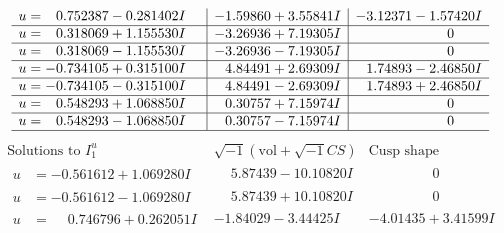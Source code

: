 \documentclass[1p]{elsarticle_modified}
\theoremstyle{definition}
\newcommand{\I}{\sqrt{-1}}
\begin{document}
$$\begin{array}{c|c|c}
\begin{aligned}
u &= \phantom{-}0.752387 - 0.281402 I\end{aligned}
 & -1.59860 + 3.55841 I & -3.12371 - 1.57420 I \\ \hline\begin{aligned}
u &= \phantom{-}0.318069 + 1.155530 I\end{aligned}
 & -3.26936 + 7.19305 I & \phantom{-0.000000 } 0 \\ \hline\begin{aligned}
u &= \phantom{-}0.318069 - 1.155530 I\end{aligned}
 & -3.26936 - 7.19305 I & \phantom{-0.000000 } 0 \\ \hline\begin{aligned}
u &= -0.734105 + 0.315100 I\end{aligned}
 & \phantom{-}4.84491 + 2.69309 I & \phantom{-}1.74893 - 2.46850 I \\ \hline\begin{aligned}
u &= -0.734105 - 0.315100 I\end{aligned}
 & \phantom{-}4.84491 - 2.69309 I & \phantom{-}1.74893 + 2.46850 I \\ \hline\begin{aligned}
u &= \phantom{-}0.548293 + 1.068850 I\end{aligned}
 & \phantom{-}0.30757 + 7.15974 I & \phantom{-0.000000 } 0 \\ \hline\begin{aligned}
u &= \phantom{-}0.548293 - 1.068850 I\end{aligned}
 & \phantom{-}0.30757 - 7.15974 I & \phantom{-0.000000 } 0\\
 \hline 
 \end{array}$$\newpage$$\begin{array}{c|c|c}  
\text{Solutions to }I^u_{1}& \I (\text{vol} + \sqrt{-1}CS) & \text{Cusp shape}\\
 \hline 
\begin{aligned}
u &= -0.561612 + 1.069280 I\end{aligned}
 & \phantom{-}5.87439 - 10.10820 I & \phantom{-0.000000 } 0 \\ \hline\begin{aligned}
u &= -0.561612 - 1.069280 I\end{aligned}
 & \phantom{-}5.87439 + 10.10820 I & \phantom{-0.000000 } 0 \\ \hline\begin{aligned}
u &= \phantom{-}0.746796 + 0.262051 I\end{aligned}
 & -1.84029 - 3.44425 I & -4.01435 + 3.41599 I \\ \hline\begin{aligned}

\end{aligned}
\end{array}$$
\end{document}
